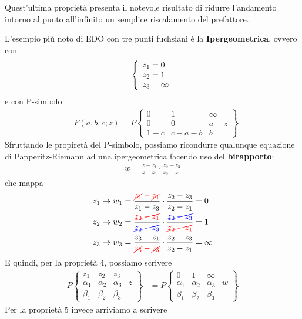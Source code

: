 Quest'ultima proprietà presenta il notevole risultato di ridurre l'andamento intorno al punto all'infinito un semplice riscalamento del prefattore.

\newpage
{}
L'esempio più noto di EDO con tre punti fuchsiani è la \textbf{Ipergeometrica}, ovvero con
\begin{align}
	\triple{z_1 = 0\hfill}{z_2 = 1\hfill}{z_3 = \infty}
\end{align}
e con P-simbolo
\begin{align}
	&F(a,b,c;z)=P\left\{\begin{matrix}
		0 & 1 & \infty & \\
		0 & 0 & a& z\\
		1-c & c-a-b & b & 
	\end{matrix}\right\}
\end{align}
Sfruttando le propiretà del P-simbolo, possiamo ricondurre qualunque equazione di Papperitz-Riemann ad una ipergeometrica facendo uso del \textbf{birapporto}:
\begin{align}
	w = \frac{z-z_1}{z-z_3}\cdot\frac{z_2-z_3}{z_2-z_1}
\end{align}
che mappa
\begin{align}
	&z_1 \to w_1 = \frac{\textcolor{red}{\cancel{z_1}-\cancel{z_1}}}{z_1-z_3}\cdot\frac{z_2-z_3}{z_2-z_1} = 0\\
	&z_2 \to w_2 = \frac{\textcolor{red}{\cancel{z_2-z_1}}}{\textcolor{blue}{\cancel{z_2-z_3}}}\cdot\frac{\textcolor{blue}{\cancel{z_2-z_3}}}{\textcolor{red}{\cancel{z_2-z_1}}} = 1\\
	&z_3 \to w_3 = \frac{z_3-z_1}{\textcolor{red}{\cancel{z_3}-\cancel{z_3}}}\cdot\frac{z_2-z_3}{z_2-z_1} = \infty
\end{align}
E quindi, per la proprietà 4, possiamo scrivere
\begin{align}
	P\left\{\begin{matrix}
			z_1 & z_2 & z_3 & \\
			\alpha_1 & \alpha_2 & \alpha_3& z\\
			\beta_1 & \beta_2 & \beta_3 & 
		\end{matrix}\right\} &=P\left\{\begin{matrix}
		0 & 1 & \infty & \\
		\alpha_1 & \alpha_2 & \alpha_3& w\\
		\beta_1 & \beta_2 & \beta_3 & 
	\end{matrix}\right\} 
\end{align}
Per la proprietà 5 invece arriviamo a scrivere
